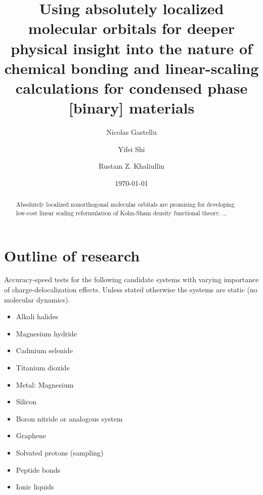\documentclass[aps,prb,twocolumn,amsmath,amssymb,superscriptaddress,longbibliography]{revtex4-1}
\begin{document}
\title{
Using absolutely localized molecular orbitals for deeper physical insight into the nature of chemical bonding and linear-scaling calculations for condensed phase [binary] materials 
}

\author{Nicolas Gastellu}
\author{Yifei Shi}
\author{Rustam Z. Khaliullin}

\date{\today}

\begin{abstract}
Absolutely localized nonorthogonal molecular orbitals are promising for developing low-cost linear scaling reformulation of Kohn-Sham density functional theory. $\ldots$
\end{abstract}

\maketitle
 
\section{Outline of research}

Accuracy-speed tests for the following candidate systems with varying importance of charge-delocalization effects. Unless stated otherwise the systems are static (no molecular dynamics).

\begin{itemize}
\item Alkali halides
\item Magnesium hydride
\item Cadmium selenide
\item Titanium dioxide
\item Metal: Magnesium
\item Silicon
\item Boron nitride or analogous system
\item Graphene
\item Solvated protons (sampling)
\item Peptide bonds
\item Ionic liquids
\end{itemize}
\end{document}
